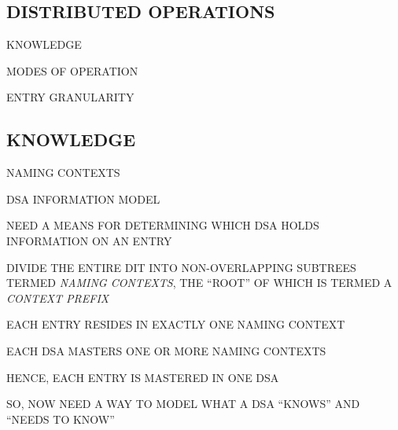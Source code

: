\begin{bwslide}
\part	{DISTRIBUTED OPERATIONS}\bf

\begin{nrtc}
\item	KNOWLEDGE

\item	MODES OF OPERATION

\item	ENTRY GRANULARITY
\end{nrtc}
\end{bwslide}


\begin{bwslide}
\part*	{KNOWLEDGE}\bf

\begin{nrtc}
\item	NAMING CONTEXTS

\item	DSA INFORMATION MODEL
\end{nrtc}
\end{bwslide}


\begin{bwslide}

\begin{nrtc}
\item	NEED A MEANS FOR DETERMINING WHICH DSA HOLDS INFORMATION ON AN ENTRY

\item	DIVIDE THE ENTIRE DIT INTO NON-OVERLAPPING SUBTREES
	TERMED \emph{NAMING CONTEXTS},
	THE ``ROOT'' OF WHICH IS TERMED A \emph{CONTEXT PREFIX}

\item	EACH ENTRY RESIDES IN EXACTLY ONE NAMING CONTEXT
\end{nrtc}
\end{bwslide}




\begin{bwslide}

\begin{nrtc}
\item	EACH DSA MASTERS ONE OR MORE NAMING CONTEXTS

\item	HENCE, EACH ENTRY IS MASTERED IN ONE DSA

\item	SO, NOW NEED A WAY TO MODEL WHAT A DSA ``KNOWS'' AND ``NEEDS TO KNOW''
\end{nrtc}
\end{bwslide}


